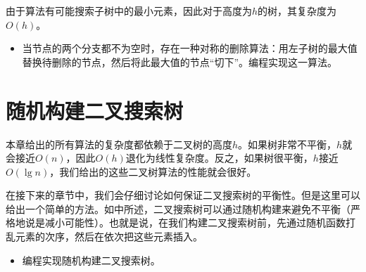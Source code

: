 \documentclass[UTF8]{article}
\begin{document}
由于算法有可能搜索子树中的最小元素，因此对于高度为$h$的树，其复杂度为$O(h)$。

\begin{Exercise}

\begin{itemize}
\item 当节点的两个分支都不为空时，存在一种对称的删除算法：用左子树的最大值替换待删除的节点，然后将此最大值的节点“切下”。编程实现这一算法。
\end{itemize}

\end{Exercise}

\section{随机构建二叉搜索树}

本章给出的所有算法的复杂度都依赖于二叉树的高度$h$。如果树非常不平衡，$h$就会接近$O(n)$，因此$O(h)$退化为线性复杂度。反之，如果树很平衡，$h$接近$O(\lg n)$，我们给出的这些二叉树算法的性能就会很好。

在接下来的章节中，我们会仔细讨论如何保证二叉搜索树的平衡性。但是这里可以给出一个简单的方法。如\cite{CLRS}中所述，二叉搜索树可以通过随机构建来避免不平衡（严格地说是减小可能性）。也就是说，在我们构建二叉搜索树前，先通过随机函数打乱元素的次序，然后在依次把这些元素插入。

\begin{Exercise}

\begin{itemize}
\item 编程实现随机构建二叉搜索树。
\end{itemize}

\end{Exercise}
\end{document}
